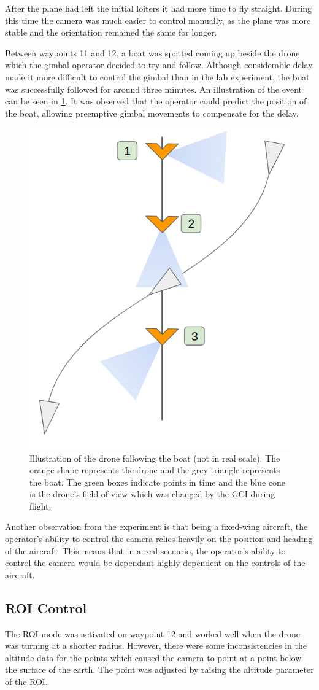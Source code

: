 \documentclass[nofilelist]{cslthse-msc}
\begin{document}
After the plane had left the initial loiters it had more time to fly straight. During this time the camera was much easier to control manually, as the plane was more stable and the orientation remained the same for longer. 

Between waypoints 11 and 12, a boat was spotted coming up beside the drone which the gimbal operator decided to try and follow. Although considerable delay made it more difficult to control the gimbal than in the lab experiment, the boat was successfully followed for around three minutes. An illustration of the event can be seen in \ref{fig:boat-follow}. It was observed that the operator could predict the position of the boat, allowing preemptive gimbal movements to compensate for the delay. 

\begin{figure}[htp]
   \centering
   \includegraphics[width=.5\textwidth]{images/drone-boat-illustration.png}
   \caption{Illustration of the drone following the boat (not in real scale). The orange shape represents the drone and the grey triangle represents the boat. The green boxes indicate points in time and the blue cone is the drone's field of view which was changed by the GCI during flight.}
   \label{fig:boat-follow}
\end{figure}

Another observation from the experiment is that being a fixed-wing aircraft, the operator's ability to control the camera relies heavily on the position and heading of the aircraft. This means that in a real scenario, the operator's ability to control the camera would be dependant highly dependent on the controls of the aircraft. 

\subsection{ROI Control}
The ROI mode was activated on waypoint 12 and worked well when the drone was turning at a shorter radius. However, there were some inconsistencies in the altitude data for the points which caused the camera to point at a point below the surface of the earth. The point was adjusted by raising the altitude parameter of the ROI. 
\end{document}
